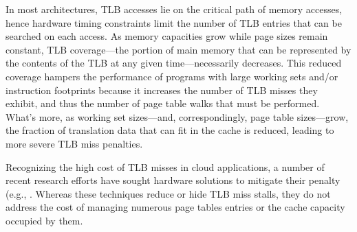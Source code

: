 In most architectures, TLB accesses lie on the critical path of memory accesses,
hence hardware timing constraints limit the number of TLB entries that can be
searched on each access.  As memory capacities grow while page sizes remain
constant, TLB coverage---the portion of main memory that can be represented by
the contents of the TLB at any given time---necessarily decreases.  This reduced
coverage hampers the performance of programs with large working sets and/or
instruction footprints because it increases the number of TLB misses they
exhibit, and thus the number of page table walks that must be performed.  What's
more, as working set sizes---and, correspondingly, page table sizes---grow, the
fraction of translation data that can fit in the cache is reduced, leading to
more severe TLB miss penalties.

Recognizing the high cost of TLB misses in cloud applications, a number of
recent research efforts have sought hardware solutions to mitigate their penalty
(e.g., \cite{bhattacharjee:2011:slt, srikantaiah:2010:sth, barr:2011:sms,
pham:2012:ccl, basu:2013:evm, gandhi:2014:emv}.
Whereas these techniques reduce or hide TLB miss stalls, they do not address the
cost of managing numerous page tables entries or the cache capacity occupied by
them.


